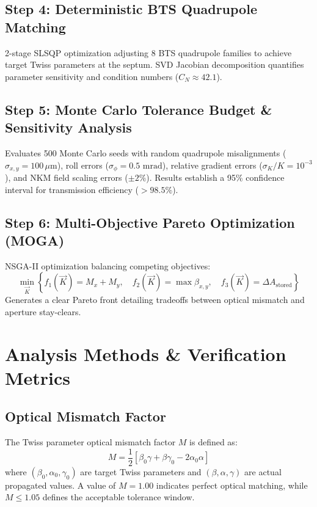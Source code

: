 \documentclass[11pt,a4paper]{article}
\begin{document}
\subsection{Step 4: Deterministic BTS Quadrupole Matching}
2-stage SLSQP optimization adjusting 8 BTS quadrupole families to achieve target Twiss parameters at the septum. SVD Jacobian decomposition quantifies parameter sensitivity and condition numbers ($C_N \approx 42.1$).

\subsection{Step 5: Monte Carlo Tolerance Budget \& Sensitivity Analysis}
Evaluates 500 Monte Carlo seeds with random quadrupole misalignments ($\sigma_{x,y} = 100\,\mu\text{m}$), roll errors ($\sigma_\phi = 0.5\text{ mrad}$), relative gradient errors ($\sigma_K/K = 10^{-3}$), and NKM field scaling errors ($\pm 2\%$). Results establish a 95\% confidence interval for transmission efficiency ($> 98.5\%$).

\subsection{Step 6: Multi-Objective Pareto Optimization (MOGA)}
NSGA-II optimization balancing competing objectives:
\begin{equation}
\min_{\vec{K}} \left\{ f_1(\vec{K}) = M_x + M_y, \quad f_2(\vec{K}) = \max \beta_{x,y}, \quad f_3(\vec{K}) = \Delta A_{\text{stored}} \right\}
\end{equation}
Generates a clear Pareto front detailing tradeoffs between optical mismatch and aperture stay-clears.

\section{Analysis Methods \& Verification Metrics}

\subsection{Optical Mismatch Factor}
The Twiss parameter optical mismatch factor $M$ is defined as:
\begin{equation}
M = \frac{1}{2} \left[ \beta_0 \gamma + \beta \gamma_0 - 2\alpha_0 \alpha \right]
\end{equation}
where $(\beta_0, \alpha_0, \gamma_0)$ are target Twiss parameters and $(\beta, \alpha, \gamma)$ are actual propagated values. A value of $M = 1.00$ indicates perfect optical matching, while $M \le 1.05$ defines the acceptable tolerance window.
\end{document}
